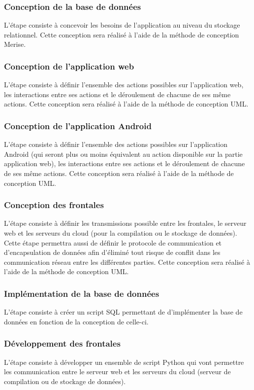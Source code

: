 \documentclass[a4paper,12pt]{article}
\begin{document}
\subsubsection{Conception de la base de données}
L'étape consiste à concevoir les besoins de l'application au niveau du stockage relationnel. Cette conception sera réalisé à l'aide de la méthode de conception Merise.

\subsubsection{Conception de l'application web}
L'étape consiste à définir l'ensemble des actions possibles sur l'application web, les interactions entre ses actions et le déroulement de chacune de ses même actions. Cette conception sera réalisé à l'aide de la méthode de conception UML.

\subsubsection{Conception de l'application Android}
L'étape consiste à définir l'ensemble des actions possibles sur l'application Android (qui seront plus ou moins équivalent au action disponible sur la partie application web), les interactions entre ses actions et le déroulement de chacune de ses même actions. Cette conception sera réalisé à l'aide de la méthode de conception UML.

\subsubsection{Conception des frontales}
L'étape consiste à définir les transmissions possible entre les frontales, le serveur web et les serveurs du cloud (pour la compilation ou le stockage de données). Cette étape permettra aussi de définir le protocole de communication et d'encapsulation de données afin d'éliminé tout risque de conflit dans les communication réseau entre les différentes parties. Cette conception sera réalisé à l'aide de la méthode de conception UML.

\subsubsection{Implémentation de la base de données}
L'étape consiste à créer un script SQL permettant de d'implémenter la base de données en fonction de la conception de celle-ci.

\subsubsection{Développement des frontales}
L'étape consiste à développer un ensemble de script Python qui vont permettre les communication entre le serveur web et les serveurs du cloud (serveur de compilation ou de stockage de données).
\end{document}
